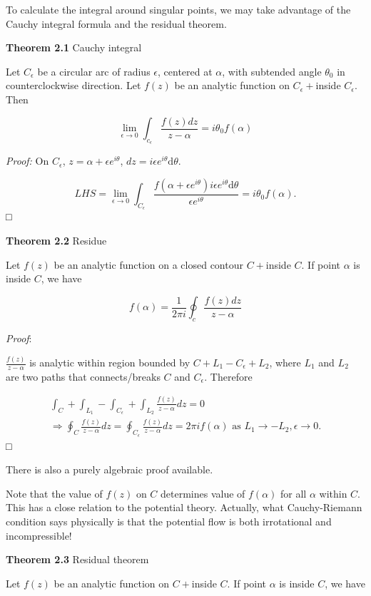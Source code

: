 \documentclass[
  notoc %
]{tufte-book}
\begin{document}
To calculate the integral around singular points, we may take advantage
of the Cauchy integral formula and the residual theorem.

\textbf{Theorem 2.1} Cauchy integral

Let \(C_\epsilon\) be a circular arc of radius \(\epsilon\), centered at
\(\alpha\), with subtended angle \(\theta_0\) in counterclockwise
direction. Let \(f(z)\) be an analytic function on \(C_\epsilon+\)inside
\(C_\epsilon\). Then

\[
\lim_{\epsilon\rightarrow0}\int_{c_\epsilon}\frac{f(z)dz}{z-\alpha}=i\theta_0 f(\alpha)
\]

\emph{Proof:} On \(C_\epsilon\), \(z=\alpha+\epsilon e^{i\theta}\),
\(dz=i\epsilon e^{i\theta}\mathrm{d}\theta\).

\[
LHS=\lim_{\epsilon\rightarrow0}\int_{C_\epsilon}\frac{f(\alpha+\epsilon e^{i\theta})i\epsilon e^{i\theta}\mathrm{d}\theta}{\epsilon e^{i\theta}}=i\theta_0 f(\alpha).
\] □

\textbf{Theorem 2.2} Residue

Let \(f(z)\) be an analytic function on a closed contour \(C+\)inside
\(C\). If point \(\alpha\) is inside \(C\), we have

\[
f(\alpha)=\frac{1}{2\pi i}\oint_c \frac{f(z)dz}{z-\alpha}
\]

\emph{Proof}:

\(\frac{f(z)}{z-\alpha}\) is analytic within region bounded by
\(C+L_1-C_\epsilon+L_2\), where \(L_1\) and \(L_2\) are two paths that
connects/breaks \(C\) and \(C_\epsilon\). Therefore

\[
\begin{aligned}
\int_{C}+\int_{L_1}-\int_{C_\epsilon}+\int_{L_2}\frac{f(z)}{z-\alpha}dz=0 \\
\Rightarrow \oint_{C}\frac{f(z)}{z-\alpha}dz=\oint_{C_\epsilon}\frac{f(z)}{z-\alpha}dz=2\pi i f(\alpha) \textrm{ as }L_1\rightarrow -L_2,\epsilon\rightarrow0 .
\end{aligned}
\] □

There is also a purely algebraic proof available.

Note that the value of \(f(z)\) on \(C\) determines value of
\(f(\alpha)\) for all \(\alpha\) within \(C\). This has a close relation
to the potential theory. Actually, what Cauchy-Riemann condition says
physically is that the potential flow is both irrotational and
incompressible!

\textbf{Theorem 2.3} Residual theorem

Let \(f(z)\) be an analytic function on \(C+\)inside \(C\). If point
\(\alpha\) is inside \(C\), we have
\end{document}
